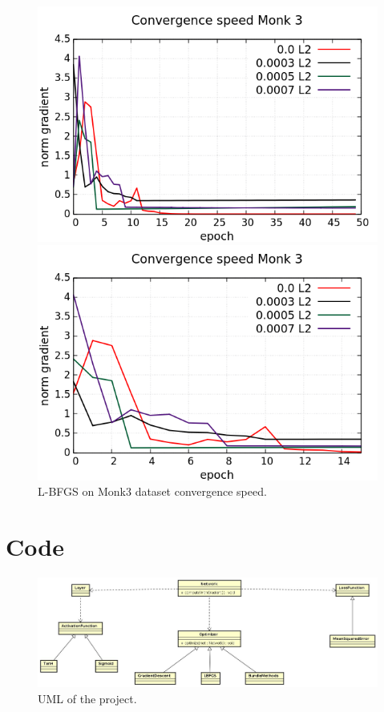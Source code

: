 \begin{figure}[H]
	\centering
	\begin{minipage}[t]{0.5\linewidth}
		\includegraphics[width=\linewidth]{data/LBFGS/Monk3/Monk3_LBFGS_L2_CS_standard.png}
	\end{minipage}%
	\begin{minipage}[t]{0.5\linewidth}
		\includegraphics[width=\linewidth]{data/LBFGS/Monk3/Monk3_LBFGS_L2_CS_zoom.png}
	\end{minipage}
	\caption{L-BFGS on Monk3 dataset convergence speed.}
\end{figure}

\section{Code}
\begin{figure}[H]
	\centering
	\includegraphics[width=\linewidth]{img/uml.jpg}
	\caption{UML of the project.}
\end{figure}
\newpage